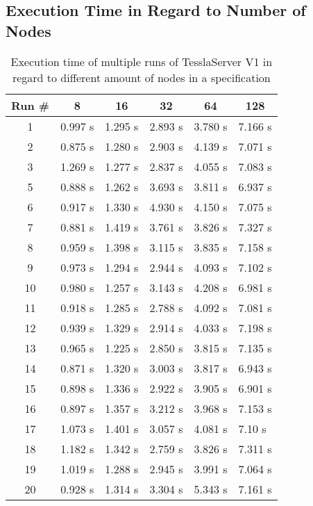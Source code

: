 \clearpage

\subsection{Execution Time in Regard to Number of Nodes}
\label{sec:appendix:runtime_benchmark_data:ram_usage_events}

\begin{table}[!htb]
  \centering
  \caption{Execution time of multiple runs of TesslaServer V1 in regard to different amount of nodes in a specification}
  \label{table:tessla_server_v1_num_nodes}
  \begin{tabular}{clllll}
    Run \# & \multicolumn{1}{c}{8} & \multicolumn{1}{c}{16} & \multicolumn{1}{c}{32} & \multicolumn{1}{c}{64} & \multicolumn{1}{c}{128}\\ \hline
    1 & 0.997 s & 1.295 s & 2.893 s & 3.780 s & 7.166 s \\
    2 & 0.875 s & 1.280 s & 2.903 s & 4.139 s & 7.071 s \\
    3 & 1.269 s & 1.277 s & 2.837 s & 4.055 s & 7.083 s \\
    5 & 0.888 s & 1.262 s & 3.693 s & 3.811 s & 6.937 s \\
    6 & 0.917 s & 1.330 s & 4.930 s & 4.150 s & 7.075 s \\
    7 & 0.881 s & 1.419 s & 3.761 s & 3.826 s & 7.327 s \\
    8 & 0.959 s & 1.398 s & 3.115 s & 3.835 s & 7.158 s \\
    9 & 0.973 s & 1.294 s & 2.944 s & 4.093 s & 7.102 s \\
    10 &0.980 s & 1.257 s & 3.143 s & 4.208 s & 6.981 s \\
    11 &0.918 s & 1.285 s & 2.788 s & 4.092 s & 7.081 s \\
    12 &0.939 s & 1.329 s & 2.914 s & 4.033 s & 7.198 s \\
    13 &0.965 s & 1.225 s & 2.850 s & 3.815 s & 7.135 s \\
    14 &0.871 s & 1.320 s & 3.003 s & 3.817 s & 6.943 s \\
    15 &0.898 s & 1.336 s & 2.922 s & 3.905 s & 6.901 s \\
    16 &0.897 s & 1.357 s & 3.212 s & 3.968 s & 7.153 s \\
    17 &1.073 s & 1.401 s & 3.057 s & 4.081 s & 7.10 s  \\
    18 &1.182 s & 1.342 s & 2.759 s & 3.826 s & 7.311 s \\
    19 &1.019 s & 1.288 s & 2.945 s & 3.991 s & 7.064 s \\
    20 &0.928 s & 1.314 s & 3.304 s & 5.343 s & 7.161 s
  \end{tabular}
\end{table}

